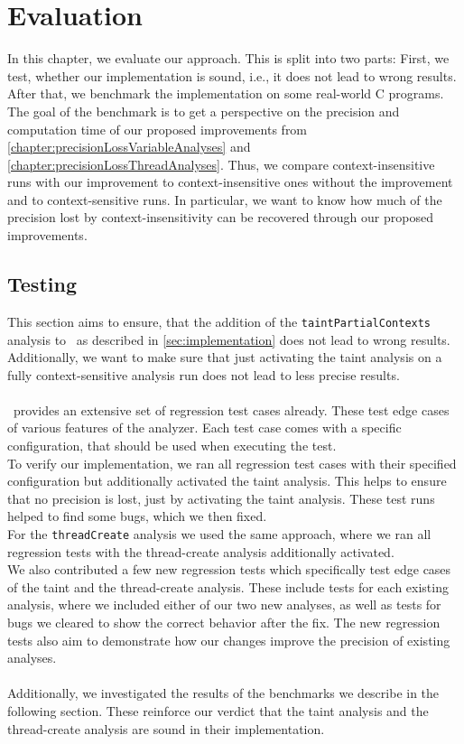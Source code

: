 
\chapter{Evaluation}\label{chapter:evaluation}
  In this chapter, we evaluate our approach. This is split into two parts: First, we test, whether our implementation is sound, i.e., it does not lead to wrong results. After that, we benchmark the implementation on some real-world C programs. The goal of the benchmark is to get a perspective on the precision and computation time of our proposed improvements from \autoref{chapter:precisionLossVariableAnalyses} and \autoref{chapter:precisionLossThreadAnalyses}. Thus, we compare context-insensitive runs with our improvement to context-insensitive ones without the improvement and to context-sensitive runs. In particular, we want to know how much of the precision lost by context-insensitivity can be recovered through our proposed improvements.

  \section{Testing}
    This section aims to ensure, that the addition of the \texttt{taintPartialContexts} analysis to \gob\ as described in \autoref{sec:implementation} does not lead to wrong results. Additionally, we want to make sure that just activating the taint analysis on a fully context-sensitive analysis run does not lead to less precise results.\\
    \\
    \gob\ provides an extensive set of regression test cases already. These test edge cases of various features of the analyzer. Each test case comes with a specific configuration, that should be used when executing the test.\\
    To verify our implementation, we ran all regression test cases with their specified configuration but additionally activated the taint analysis. This helps to ensure that no precision is lost, just by activating the taint analysis. These test runs helped to find some bugs, which we then fixed.\\
    For the \texttt{threadCreate} analysis we used the same approach, where we ran all regression tests with the thread-create analysis additionally activated.\\
    We also contributed a few new regression tests which specifically test edge cases of the taint and the thread-create analysis. These include tests for each existing analysis, where we included either of our two new analyses, as well as tests for bugs we cleared to show the correct behavior after the fix. The new regression tests also aim to demonstrate how our changes improve the precision of existing analyses.\\
    \\
    Additionally, we investigated the results of the benchmarks we describe in the following section. These reinforce our verdict that the taint analysis and the thread-create analysis are sound in their implementation.
  
